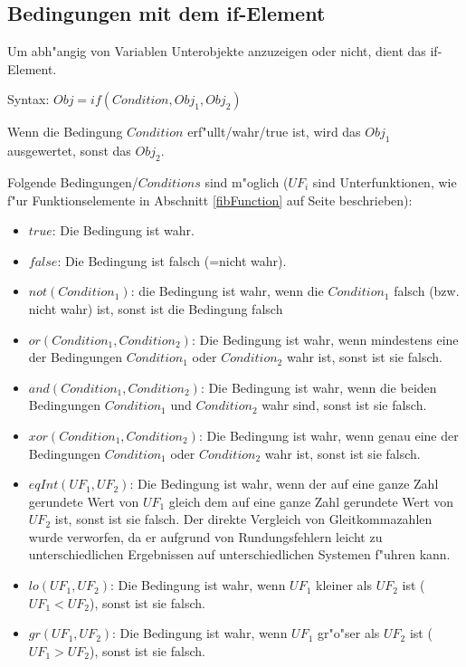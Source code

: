 

\subsection{Bedingungen mit dem if-Element}
\label{secFibIf}

Um abh"angig von Variablen Unterobjekte anzuzeigen oder nicht, dient das if-Element.

\bigskip\noindent
Syntax:
$Obj=if( Condition, Obj_1, Obj_2)$

Wenn die Bedingung $Condition$ erf"ullt/wahr/true ist, wird das $Obj_1$ ausgewertet, sonst das $Obj_2$.

\bigskip\noindent
Folgende Bedingungen/$Conditions$ sind m"oglich ($UF_i$ sind Unterfunktionen, wie f"ur Funktionselemente in Abschnitt \ref{fibFunction} auf Seite \pageref{fibFunction} beschrieben):
\begin{itemize}
 \item $true$: Die Bedingung ist wahr.
 \item $false$: Die Bedingung ist falsch (=nicht wahr).
 \item $not(Condition_1)$: die Bedingung ist wahr, wenn die $Condition_1$ falsch (bzw. nicht wahr) ist, sonst ist die Bedingung falsch
 \item $or( Condition_1, Condition_2)$: Die Bedingung ist wahr, wenn mindestens eine der Bedingungen $Condition_1$ oder $Condition_2$ wahr ist, sonst ist sie falsch.
 \item $and( Condition_1, Condition_2)$: Die Bedingung ist wahr, wenn die beiden Bedingungen $Condition_1$ und $Condition_2$ wahr sind, sonst ist sie falsch.
 \item $xor( Condition_1, Condition_2)$: Die Bedingung ist wahr, wenn genau eine der Bedingungen $Condition_1$ oder $Condition_2$ wahr ist, sonst ist sie falsch.

 \item $eqInt(UF_1,UF_2)$: Die Bedingung ist wahr, wenn der auf eine ganze Zahl gerundete Wert von $UF_1$ gleich dem auf eine ganze Zahl gerundete Wert von $UF_2$ ist, sonst ist sie falsch. Der direkte Vergleich von Gleitkommazahlen wurde verworfen, da er aufgrund von Rundungsfehlern leicht zu unterschiedlichen Ergebnissen auf unterschiedlichen Systemen f"uhren kann.
 \item $lo(UF_1,UF_2)$: Die Bedingung ist wahr, wenn $UF_1$ kleiner als $UF_2$ ist ($UF_1<UF_2$), sonst ist sie falsch.
 \item $gr(UF_1,UF_2)$: Die Bedingung ist wahr, wenn $UF_1$ gr"o"ser als $UF_2$ ist ($UF_1>UF_2$), sonst ist sie falsch.
\end{itemize}


